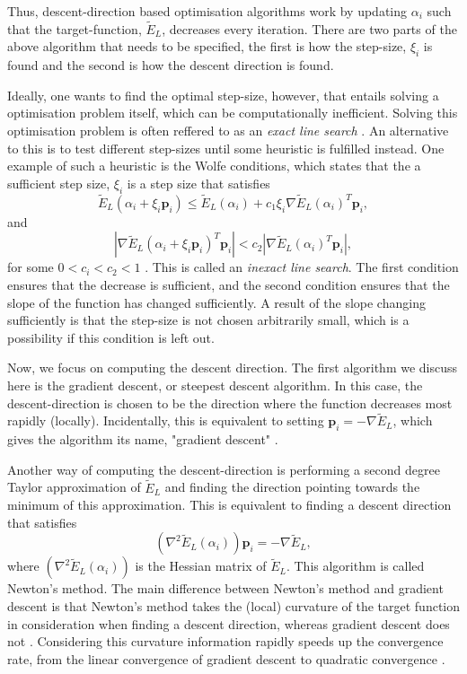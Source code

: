 \documentclass[11pt,a4paper]{article}
\numberwithin{equation}{section}
\begin{document}
Thus, descent-direction based optimisation algorithms work by updating $\alpha_i$ such that the target-function, $\tilde{E}_L$, decreases every iteration. There are two parts of the above algorithm that needs to be specified, the first is how the step-size, $\xi_i$ is found and the second is how the descent direction is found. 

Ideally, one wants to find the optimal step-size, however, that entails solving a optimisation problem itself, which can be computationally inefficient. Solving this optimisation problem is often reffered to as an \emph{exact line search} \cite{nocedal.book}. An alternative to this is to test different step-sizes until some heuristic is fulfilled instead. One example of such a heuristic is the Wolfe conditions, which states that the a sufficient step size, $\xi_i$ is a step size that satisfies
\begin{equation}
    \tilde{E}_L(\alpha_i + \xi_i \bm{p}_i) \leq \tilde{E}_L(\alpha_i) + c_1\xi_i \nabla \tilde{E}_L(\alpha_i)^T\bm{p}_i,
\end{equation}
and
\begin{equation}
    |\nabla \tilde{E}_L(\alpha_i + \xi_i \bm{p}_i)^T\bm{p}_i| < c_2 |\nabla \tilde{E}_L(\alpha_i)^T \bm{p}_i |,
\end{equation}
for some $0 < c_i < c_2 < 1$ \cite{nocedal.book}. This is called an \emph{inexact line search}. The first condition ensures that the decrease is sufficient, and the second condition ensures that the slope of the function has changed sufficiently. A result of the slope changing sufficiently is that the step-size is not chosen arbitrarily small, which is a possibility if this condition is left out.

Now, we focus on computing the descent direction. The first algorithm we discuss here is the gradient descent, or steepest descent algorithm. In this case, the descent-direction is chosen to be the direction where the function decreases most rapidly (locally). Incidentally, this is equivalent to setting $\bm{p}_i = -\nabla \tilde{E}_L$, which gives the algorithm its name, "gradient descent" \cite{nocedal.book}.

Another way of computing the descent-direction is performing a second degree Taylor approximation of $\tilde{E}_L$ and finding the direction pointing towards the minimum of this approximation. This is equivalent to finding a descent direction that satisfies
\begin{equation}
    (\nabla^2 \tilde{E}_L(\alpha_i))\bm{p}_i = -\nabla \tilde{E}_L,
\end{equation}
where $(\nabla^2 \tilde{E}_L(\alpha_i))$ is the Hessian matrix of $\tilde{E}_L$. This algorithm is called Newton's method. The main difference between Newton's method and gradient descent is that Newton's method takes the (local) curvature of the target function in consideration when finding a descent direction, whereas gradient descent does not \cite{nocedal.book}. Considering this curvature information rapidly speeds up the convergence rate, from the linear convergence of gradient descent to quadratic convergence \cite{nocedal.book}.
\end{document}

